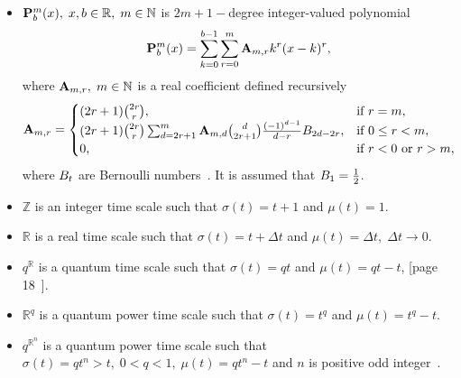 \begin{itemize}
    \item ${\mathbf{P}}\sp{m} \sb{b}(x), \; x,b\in\mathbb{R}, \; m\in\mathbb{N}$ is $2m+1-$degree integer-valued polynomial~\cite{kolosov2016link}
    \begin{equation}
        {\mathbf{P}}\sp{m} \sb{b}(x) = \sum_{k=0}^{b-1} \sum_{r=0}^{m} {\mathbf{A}} \sb{m,r} k^r(x-k)^r,
        \label{eq:polynomial_p}
    \end{equation}
    where ${\mathbf{A}} \sb{m,r}, \; m\in\mathbb{N}$ is a real coefficient defined recursively
    \[
        {\mathbf{A}} \sb{m,r} =
        \begin{cases}
        (2r+1)
            \binom{2r}{r}, & \text{if } r=m,\\
            (2r+1) \binom{2r}{r} \sum_{d=2r+1}^{m} {\mathbf{A}} \sb{m,d} \binom{d}{2r+1} \frac{(-1)^{d-1}}{d-r}
            {B}\sb{2d-2r}, & \text{if } 0 \leq r<m,\\
            0, & \text{if } r<0 \text{ or } r>m,
        \end{cases}
    \]
    where ${B}\sb{t}$ are Bernoulli numbers~\cite{WeissteinBernoulli}.
    It is assumed that ${B}\sb{1}=\frac{1}{2}$.

    \item $\mathbb{Z}$ is an integer time scale such that $\sigma(t) = t+1$ and $\mu(t) = 1$.

    \item $\mathbb{R}$ is a real time scale such that $\sigma(t) = t+\Delta t$ and $\mu(t) = \Delta t, \; \Delta t \to 0$.

    \item $q^\mathbb{R}$ is a quantum time scale such that $\sigma(t) = qt$ and $\mu(t) = qt - t$,
    [page 18~\cite{Bohner2001DynamicEO}].

    \item $\mathbb{R}^q$ is a quantum power time scale such that $\sigma(t) = t^q$ and $\mu(t) = t^q - t$.

    \item $q^{\mathbb{R}^n}$ is a quantum power time scale
    such that $\sigma(t) = qt^n > t, \; 0<q<1, \; \mu(t) = qt^n - t$ and $n$ is positive
    odd integer~\cite{aldwoah2011power}.
\end{itemize}